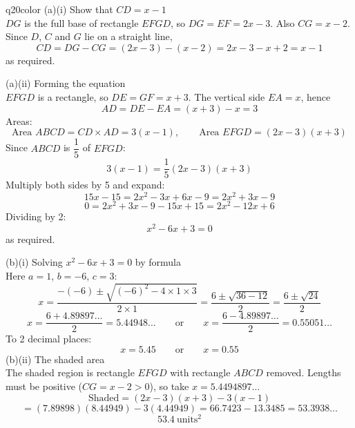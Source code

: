 \documentclass[11pt,a4paper]{article}
\begin{document}
\begin{ansbox}{q20color}
(a)(i) Show that $CD = x - 1$\\[4pt]
$DG$ is the full base of rectangle $EFGD$, so $DG = EF = 2x - 3$. Also $CG = x - 2$. Since $D$, $C$ and $G$ lie on a straight line,
\[
CD = DG - CG = (2x - 3) - (x - 2) = 2x - 3 - x + 2 = x - 1
\]
as required.

(a)(ii) Forming the equation\\[4pt]
$EFGD$ is a rectangle, so $DE = GF = x + 3$. The vertical side $EA = x$, hence
\[
AD = DE - EA = (x + 3) - x = 3
\]
Areas:
\[
\text{Area } ABCD = CD \times AD = 3(x-1), \qquad \text{Area } EFGD = (2x-3)(x+3)
\]
Since $ABCD$ is $\dfrac{1}{5}$ of $EFGD$:
\[
3(x-1) = \frac{1}{5}(2x-3)(x+3)
\]
Multiply both sides by 5 and expand:
\[
15x - 15 = 2x^2 - 3x + 6x - 9 = 2x^2 + 3x - 9
\]
\[
0 = 2x^2 + 3x - 9 - 15x + 15 = 2x^2 - 12x + 6
\]
Dividing by 2:
\[
x^2 - 6x + 3 = 0
\]
as required.

(b)(i) Solving $x^2 - 6x + 3 = 0$ by formula\\[4pt]
Here $a = 1$, $b = -6$, $c = 3$:
\[
x = \frac{-(-6) \pm \sqrt{(-6)^2 - 4\times1\times3}}{2\times1} = \frac{6 \pm \sqrt{36 - 12}}{2} = \frac{6 \pm \sqrt{24}}{2}
\]
\[
x = \frac{6 + 4.89897\ldots}{2} = 5.44948\ldots \qquad \text{or} \qquad x = \frac{6 - 4.89897\ldots}{2} = 0.55051\ldots
\]
To 2 decimal places:
\[
x = \boxed{5.45} \qquad \text{or} \qquad x = \boxed{0.55}
\]
(b)(ii) The shaded area\\[4pt]
The shaded region is rectangle $EFGD$ with rectangle $ABCD$ removed. Lengths must be positive ($CG = x - 2 > 0$), so take $x = 5.4494897\ldots$
\[
\text{Shaded} = (2x-3)(x+3) - 3(x-1)
\]
\[
= (7.89898)(8.44949) - 3(4.44949) = 66.7423 - 13.3485 = 53.3938\ldots
\]
\[
\boxed{53.4\ \text{units}^2}
\]
\end{ansbox}
\end{document}
